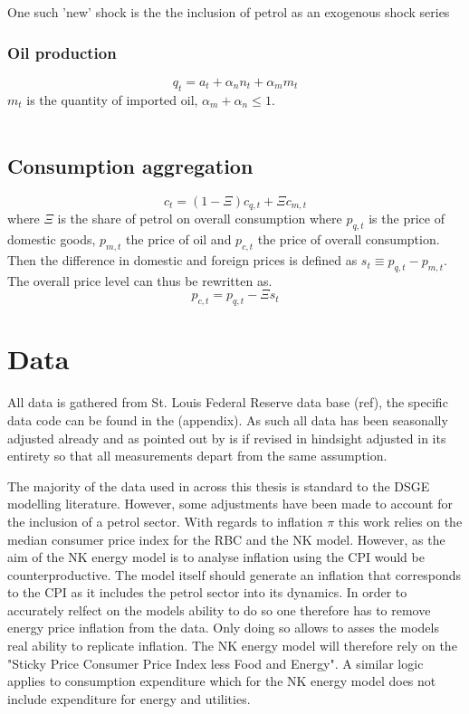 \documentclass[12pt,a4paper,english]{article} %
\let\oldsection\section
\renewcommand\section{\clearpage\oldsection}
\begin{document}
	
	One such 'new' shock is the the inclusion of petrol as an exogenous shock series \cite{kim_role_1992}
	
	
	\subsubsection{Oil production}
	\begin{equation}
		q_t = a_t + \alpha_n n_t + \alpha_m m_t
	\end{equation}
	$m_t$ is the quantity of imported oil, $\alpha_m + \alpha_n \leq 1$.\\
	\\
	\subsection{Consumption aggregation}
	\begin{equation}
		c_t = (1 - \Xi) c_{q,t} + \Xi c_{m, t}
	\end{equation}
	where $\Xi$ is the share of petrol on overall consumption
	where $p_{q,t}$ is the price of domestic goods, $p_{m,t}$ the price of oil and $p_{c,t}$ the price of overall consumption. Then the difference in domestic and foreign prices is defined as $s_t \equiv p_{q,t} - p_{m,t}$. The overall price level can thus be rewritten as. 
	\begin{equation}
		p_{c,t} = p_{q,t} - \Xi s_t
	\end{equation}
	
	
	
	\section{Data}
	
	All data is gathered from St. Louis Federal Reserve data base (ref), the specific data code can be found in the (appendix). As such all data has been seasonally adjusted already and as pointed out by \cite{pfeifer_guide_2021} is if revised in hindsight adjusted in its entirety so that all measurements depart from the same assumption.
	
	The majority of the data used in across this thesis is standard to the DSGE modelling literature. However, some adjustments have been made to account for the inclusion of a petrol sector.
	With regards to inflation $\pi$ this work relies on the median consumer price index for the RBC and the NK model. However, as the aim of the NK energy model is to analyse inflation using the CPI would be counterproductive. The model itself should generate an inflation that corresponds to the CPI as it includes the petrol sector into its dynamics. In order to accurately relfect on the models ability to do so one therefore has to remove energy price inflation from the data. Only doing so allows to asses the models real ability to replicate inflation. The NK energy model will therefore rely on the "Sticky Price Consumer Price Index less Food and Energy". A similar logic applies to consumption expenditure which for the NK energy model does not include expenditure for energy and utilities.
	
\end{document}
